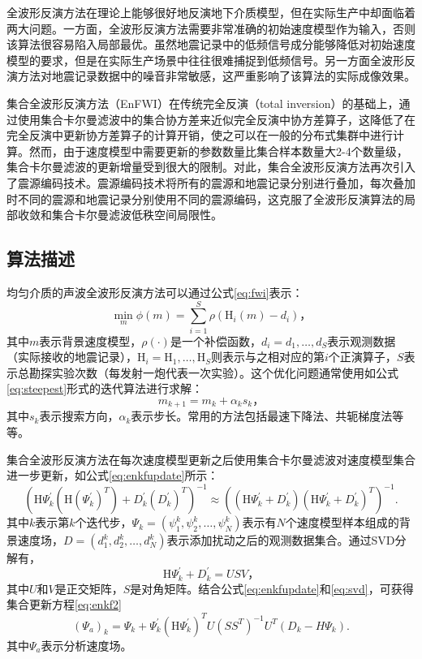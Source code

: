 全波形反演方法在理论上能够很好地反演地下介质模型，但在实际生产中却面临着两大问题。一方面，全波形反演方法需要非常准确的初始速度模型作为输入，否则该算法很容易陷入局部最优\cite{virieux2009overview}。虽然地震记录中的低频信号成分能够降低对初始速度模型的要求，但是在实际生产场景中往往很难捕捉到低频信号\cite{sirgue2006importance}。另一方面全波形反演方法对地震记录数据中的噪音非常敏感，这严重影响了该算法的实际成像效果。

集合全波形反演方法（EnFWI）\cite{yushu,he2015ensemble}在传统完全反演\cite{tarantola1982generalized}（total inversion）的基础上，通过使用集合卡尔曼滤波\cite{evensen2003ensemble}中的集合协方差来近似完全反演中协方差算子，这降低了在完全反演中更新协方差算子的计算开销，使之可以在一般的分布式集群中进行计算。然而，由于速度模型中需要更新的参数数量比集合样本数量大2-4个数量级，集合卡尔曼滤波的更新增量受到很大的限制。对此，集合全波形反演方法再次引入了震源编码技术\cite{krebs2009fast}。震源编码技术将所有的震源和地震记录分别进行叠加，每次叠加时不同的震源和地震记录分别使用不同的震源编码，这克服了全波形反演算法的局部收敛\cite{castellanos2014fast}和集合卡尔曼滤波低秩空间局限性。

\subsection{算法描述}
均匀介质的声波全波形反演方法可以通过公式\ref{eq:fwi}表示：
\begin{equation}
\label{eq:fwi}
  \min_{m} \phi(m) = \sum_{i=1}^S \rho(\mbox{H}_i(m) - d_{i} )，
\end{equation}
其中$m$表示背景速度模型，$\rho(\cdot)$是一个补偿函数，$d_i=d_1, \ldots, d_S$表示观测数据（实际接收的地震记录），$\mbox{H}_i=\mbox{H}_1, \ldots, \mbox{H}_S$则表示与之相对应的第$i$个正演算子，$S$表示总勘探实验次数（每发射一炮代表一次实验）。这个优化问题通常使用如公式\ref{eq:steepest}形式的迭代算法进行求解：
\begin{equation}
\label{eq:steepest}
m_{k+1} = m_{k} + \alpha_{k}s_k，
\end{equation}
其中$s_k$表示搜索方向，$\alpha_{k}$表示步长。常用的方法包括最速下降法、共轭梯度法等等。

集合全波形反演方法在每次速度模型更新之后使用集合卡尔曼滤波对速度模型集合进一步更新，如公式\ref{eq:enkfupdate}所示：
\begin{equation}
\label{eq:enkfupdate}
\left(\mbox{H}\Psi_k^{'}(\mbox{H}(\Psi_k^{'})^T)+D_k^{'}(D_k^{'})^T\right)^{-1}\approx\left((\mbox{H}\Psi_k^{'}+D_k^{'})(\mbox{H}\Psi_k^{'}+D_k^{'})^T\right)^{-1}.
\end{equation}
其中$k$表示第$k$个迭代步，$\Psi_k=(\psi_1^k,\psi_2^k,\ldots,\psi_N^k)$表示有$N$个速度模型样本组成的背景速度场，$D=(d_1^k,d_2^k,\ldots,d_N^k)$表示添加扰动之后的观测数据集合。通过SVD分解有，
\begin{equation}
\label{eq:svd}
\mbox{H}\Psi_k^{'}+D_k^{'}=USV，
\end{equation}
其中$U$和$V$是正交矩阵，$S$是对角矩阵。结合公式\ref{eq:enkfupdate}和\ref{eq:svd}，可获得集合更新方程\ref{eq:enkf2}
\begin{equation}
\label{eq:enkf2}
(\Psi_a)_k=\Psi_k+\Psi_k^{'}(\mbox{H}\Psi_k^{'})^TU(SS^T)^{-1}U^T(D_k-H\Psi_k).
\end{equation}
其中$\Psi_a$表示分析速度场。


